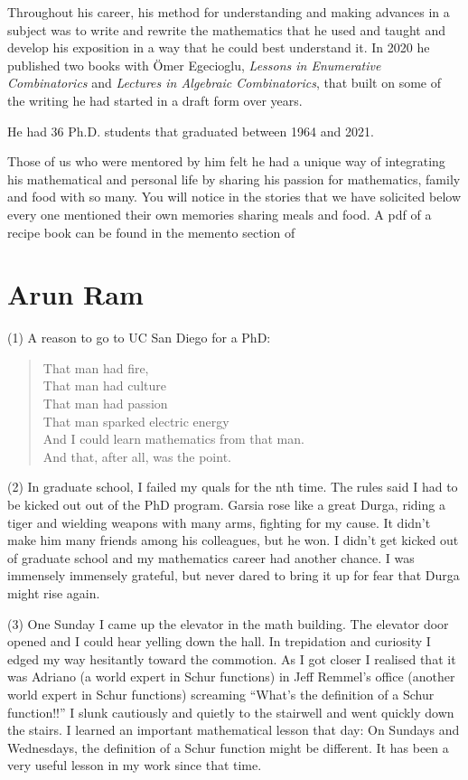 \documentclass{notices}
\begin{document}
Throughout his career, his method for understanding and making advances in a subject was to write and rewrite the mathematics that he used and taught and develop his exposition in a way that he could best understand it.  In 2020 he published two books with Ömer Egecioglu, {\it Lessons in Enumerative Combinatorics} and {\it Lectures in Algebraic Combinatorics}, that built on some of the writing he had started in a draft form over years.

He had 36 Ph.D. students that graduated between 1964 and 2021.

Those of us who were mentored by him felt he had a unique way of integrating his mathematical and personal life by sharing his passion for mathematics, family and food with so many.  You will notice in the stories that we have solicited below every one mentioned their own memories sharing meals and food.  A pdf of a
recipe book can be found in the memento section of 

\section*{Arun Ram}
(1)  A reason to go to UC San Diego for a PhD:
\begin{quote}
That man had fire,\\
That man had culture\\
That man had passion\\
That man sparked electric energy\\
And I could learn mathematics from that man.\\
And that, after all, was the point.
\end{quote}

(2) In graduate school, I failed my quals for the nth time.  
The rules said I had to be kicked out out of the PhD program.
Garsia rose like a great Durga,
riding a tiger and wielding weapons with many arms,
fighting for my cause.  
It didn't make him many friends among his colleagues, but he won.
I didn't get kicked out of graduate school and
my mathematics career had another chance.
I was immensely immensely grateful,
but never dared to bring it up
for fear that Durga might rise again.

(3) One Sunday I came up the elevator in the math building.
The elevator door opened and  I could hear yelling down the hall.  
In trepidation and curiosity I edged my way hesitantly toward the commotion.  
As I got closer I realised that it was Adriano (a world expert in Schur functions)
in Jeff Remmel's office (another world expert in Schur functions)
screaming ``What's the definition of a Schur function!!''  
I slunk cautiously and quietly to the stairwell and went quickly down the stairs.
I learned an important mathematical lesson that day:
On Sundays and Wednesdays,
the definition of a Schur function might be different.
It has been a very useful lesson in my work since that time.
\end{document}

